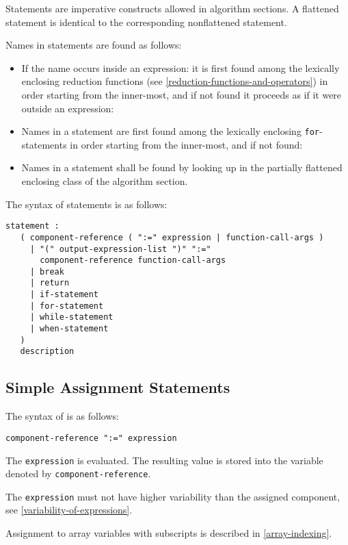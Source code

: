 Statements are imperative constructs allowed in algorithm sections.
A flattened statement is identical to the corresponding nonflattened statement.

Names in statements are found as follows:
\begin{itemize}
\item
  If the name occurs inside an expression: it is first found among the lexically enclosing reduction functions (see \cref{reduction-functions-and-operators}) in order starting from the inner-most, and if not found it proceeds as if it were outside an expression:
\item
  Names in a statement are first found among the lexically enclosing \lstinline!for!-statements in order starting from the inner-most, and if not found:
\item
  Names in a statement shall be found by looking up in the partially flattened enclosing class of the algorithm section.
\end{itemize}

The syntax of statements is as follows:
\begin{lstlisting}[language=grammar]
statement :
   ( component-reference ( ":=" expression | function-call-args )
     | "(" output-expression-list ")" ":="
       component-reference function-call-args
     | break
     | return
     | if-statement
     | for-statement
     | while-statement
     | when-statement
   )
   description
\end{lstlisting}

\subsection{Simple Assignment Statements}\label{simple-assignment-statements}

The syntax of  is as follows:
\begin{lstlisting}[language=grammar]
component-reference ":=" expression
\end{lstlisting}

The \lstinline[language=grammar]!expression! is evaluated.
The resulting value is stored into the variable denoted by \lstinline[language=grammar]!component-reference!.

The \lstinline!expression! must not have higher variability than the assigned component, see \cref{variability-of-expressions}.

Assignment to array variables with subscripts is described in \cref{array-indexing}.

